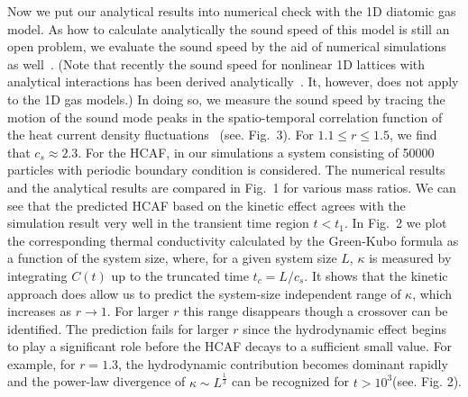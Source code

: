 \documentclass[twocolumn,secnumarabic,amssymb, nobibnotes, aps, pre,superscriptaddress]{revtex4}
\begin{document}
Now we put our analytical results into numerical check with the 1D diatomic gas model. As how to calculate analytically the sound speed of this model is still an open problem, we evaluate the sound speed by the aid of numerical simulations as well~\cite{saito, soundspeed, zhao}. (Note that recently the sound speed for nonlinear 1D lattices with analytical interactions has been derived analytically~\cite{spohn}. It, however, does not apply to the 1D gas models.) In doing so, we measure the sound speed by tracing the motion of the sound mode peaks in the spatio-temporal correlation function of the heat current density fluctuations~\cite{zhao} (see. Fig.~3). For $1.1\le r\le 1.5$, we find that $c_s\approx 2.3$. For the HCAF, in our simulations a system consisting of 50000 particles with periodic boundary condition is considered. The numerical results and the analytical results are compared in Fig.~1 for various mass ratios. We can see that the predicted HCAF based on the kinetic effect agrees with the simulation result very well in the transient time region $t<t_1$. In Fig.~2 we plot the corresponding thermal conductivity calculated by the Green-Kubo formula as a function of the system size, where, for a given system size $L$, $\kappa$ is measured by integrating $C(t)$ up to the truncated time $t_c=L/c_s$. It shows that the kinetic approach does allow us to predict the system-size independent range of $\kappa$, which increases as $r\to 1$. For larger $r$ this range disappears though a crossover can be identified. The prediction fails for larger $r$ since the hydrodynamic effect begins to play a  significant role before the HCAF decays to a sufficient small value. For example, for $r=1.3$, the hydrodynamic contribution becomes dominant rapidly and the power-law divergence of $\kappa\sim L^\frac{1}{3}$ can be recognized for $t>10^3$(see. Fig. 2).
\end{document}
